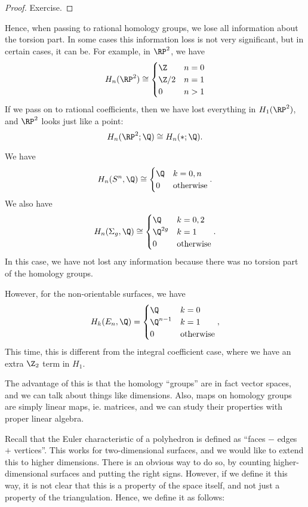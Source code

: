 \documentclass[a4paper]{article}
\begin{document}
\begin{proof}
  Exercise. %
\end{proof}
Hence, when passing to rational homology groups, we lose all information about the torsion part. In some cases this information loss is not very significant, but in certain cases, it can be. For example, in $\RP^2$, we have
\[
  H_n(\RP^2) \cong
  \begin{cases}
    \Z & n = 0\\
    \Z/2 & n = 1\\
    0 & n > 1
  \end{cases}
\]
If we pass on to rational coefficients, then we have lost everything in $H_1(\RP^2)$, and $\RP^2$ looks just like a point:
\[
  H_n(\RP^2; \Q) \cong H_n(*; \Q).
\]
\begin{eg}
  We have
  \[
    H_n(S^n, \Q) \cong
    \begin{cases}
      \Q & k = 0, n\\
      0 & \text{otherwise}
    \end{cases}.
  \]
  We also have
  \[
    H_n(\Sigma_g, \Q) \cong
    \begin{cases}
      \Q & k = 0, 2\\
      \Q^{2g} & k = 1\\
      0 & \text{otherwise}
    \end{cases}.
  \]
  In this case, we have not lost any information because there was no torsion part of the homology groups.

  However, for the non-orientable surfaces, we have
  \[
    H_k(E_n, \Q) =
    \begin{cases}
      \Q & k = 0\\
      \Q^{n - 1} & k = 1\\
      0 & \text{otherwise}
    \end{cases},
  \]
  This time, this is different from the integral coefficient case, where we have an extra $\Z_2$ term in $H_1$.
\end{eg}

The advantage of this is that the homology ``groups'' are in fact vector spaces, and we can talk about things like dimensions. Also, maps on homology groups are simply linear maps, ie. matrices, and we can study their properties with proper linear algebra.

Recall that the Euler characteristic of a polyhedron is defined as ``faces $-$ edges $+$ vertices''. This works for two-dimensional surfaces, and we would like to extend this to higher dimensions. There is an obvious way to do so, by counting higher-dimensional surfaces and putting the right signs. However, if we define it this way, it is not clear that this is a property of the space itself, and not just a property of the triangulation. Hence, we define it as follows:
\end{document}
